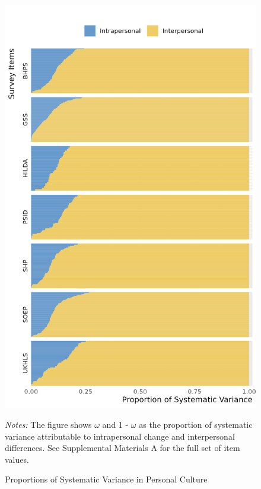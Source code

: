 \documentclass[
  12pt,
]{article}
\begin{document}
\newpage

\begin{figure}[ht]
\begin{center}
\caption{Proportions of Systematic Variance in Personal Culture}

\includegraphics[width=1\linewidth]{../figures/figure_1}

\end{center}
\footnotesize{\textit{Notes:} The figure shows $\omega$ and 1 - $\omega$ as the proportion of systematic variance attributable to intrapersonal change and interpersonal differences. See Supplemental Materials A for the full set of item values.}
\end{figure}
\end{document}
